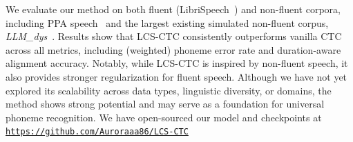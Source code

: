 We evaluate our method on both fluent (LibriSpeech~\cite{7178964}) and non-fluent corpora, including PPA speech~\cite{gorno2011classification-ppa} and the largest existing simulated non-fluent corpus, \textit{LLM\_dys}~\cite{zhang2025analysisevaluationsyntheticdata}. Results show that LCS-CTC consistently outperforms vanilla CTC across all metrics, including (weighted) phoneme error rate and duration-aware alignment accuracy. Notably, while LCS-CTC is inspired by non-fluent speech, it also provides stronger regularization for fluent speech. Although we have not yet explored its scalability across data types, linguistic diversity, or domains, the method shows strong potential and may serve as a foundation for universal phoneme recognition. We have open-sourced our model and checkpoints at \href{https://github.com/Auroraaa86/LCS-CTC}{\texttt{https://github.com/Auroraaa86/LCS-CTC}}










